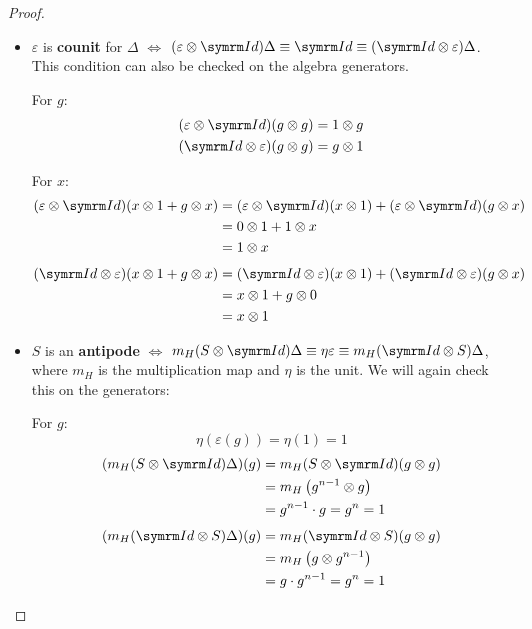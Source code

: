 \begin{proof}
\begin{itemize}
    \item \(\varepsilon\) is \textbf{counit} for \(\Delta\) \(\iff\) \((\varepsilon \tensor \Id) \Delta \equiv \Id \equiv (\Id \tensor \varepsilon) \Delta\). This condition can also be checked on the algebra generators.

    For \(g\):
    \begin{gather*}
        (\varepsilon \tensor \Id) (g \tensor g) = 1 \tensor g \\
        (\Id \tensor \varepsilon ) (g \tensor g) = g \tensor 1
    \end{gather*}

    For \(x\):
    \begin{align*}
        (\varepsilon \tensor \Id) (x \tensor 1 + g \tensor x) &= (\varepsilon \tensor \Id) (x \tensor 1) + (\varepsilon \tensor \Id) (g \tensor x) \\
        &= 0 \tensor 1 + 1 \tensor x \\
        &= 1 \tensor x
    \end{align*}
    \begin{align*}
        (\Id \tensor \varepsilon) (x \tensor 1 + g \tensor x) &= (\Id \tensor \varepsilon) (x \tensor 1) + (\Id \tensor \varepsilon) (g \tensor x) \\
        &= x \tensor 1 + g \tensor 0 \\
        &= x \tensor 1
    \end{align*}

    \item \(S\) is an \textbf{antipode} \(\iff\) \(m_H (S \tensor \Id) \Delta \equiv \eta \varepsilon \equiv m_H (\Id \tensor S) \Delta\), where \(m_H\) is the multiplication map and \(\eta\) is the unit. We will again check this on the generators:

    For \(g\):
    \[
        \eta (\varepsilon (g)) = \eta (1) = 1
    \]
    \begin{align*}
        (m_H (S \tensor \Id) \Delta) (g) &= m_H (S \tensor \Id) (g \tensor g) \\
        &= m_H \left(g^{n - 1} \tensor g\right) \\
        &= g^{n - 1} \cdot g = g^n = 1
    \end{align*}
    \begin{align*}
        (m_H (\Id \tensor S) \Delta) (g) &= m_H (\Id \tensor S) (g \tensor g) \\
        &= m_H \left(g \tensor g^{n - 1}\right) \\
        &= g \cdot g^{n - 1} = g^n = 1
    \end{align*}


\end{itemize}
\end{proof}
